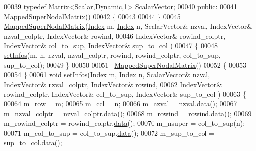 \begin{DoxyCode}
00039     \textcolor{keyword}{typedef} \hyperlink{group___core___module}{Matrix<Scalar,Dynamic,1>} \hyperlink{group___core___module}{ScalarVector};
00040   \textcolor{keyword}{public}:
00041     \hyperlink{group___sparse_l_u___module_class_eigen_1_1internal_1_1_mapped_super_nodal_matrix}{MappedSuperNodalMatrix}()
00042     \{
00043       
00044     \}
00045     \hyperlink{group___sparse_l_u___module_class_eigen_1_1internal_1_1_mapped_super_nodal_matrix}{MappedSuperNodalMatrix}(\hyperlink{namespace_eigen_a62e77e0933482dafde8fe197d9a2cfde}{Index} m, \hyperlink{namespace_eigen_a62e77e0933482dafde8fe197d9a2cfde}{Index} n,  ScalarVector& nzval, 
      IndexVector& nzval\_colptr, IndexVector& rowind,
00046              IndexVector& rowind\_colptr, IndexVector& col\_to\_sup, IndexVector& sup\_to\_col )
00047     \{
00048       \hyperlink{group___sparse_l_u___module_af1427486564e2c75b9da68f98bd04e63}{setInfos}(m, n, nzval, nzval\_colptr, rowind, rowind\_colptr, col\_to\_sup, sup\_to\_col);
00049     \}
00050     
00051     ~\hyperlink{group___sparse_l_u___module_class_eigen_1_1internal_1_1_mapped_super_nodal_matrix}{MappedSuperNodalMatrix}()
00052     \{
00053       
00054     \}
\hyperlink{group___sparse_l_u___module_af1427486564e2c75b9da68f98bd04e63}{00061}     \textcolor{keywordtype}{void} \hyperlink{group___sparse_l_u___module_af1427486564e2c75b9da68f98bd04e63}{setInfos}(\hyperlink{namespace_eigen_a62e77e0933482dafde8fe197d9a2cfde}{Index} m, \hyperlink{namespace_eigen_a62e77e0933482dafde8fe197d9a2cfde}{Index} n, ScalarVector& nzval, IndexVector& nzval\_colptr, 
      IndexVector& rowind,
00062              IndexVector& rowind\_colptr, IndexVector& col\_to\_sup, IndexVector& sup\_to\_col )
00063     \{
00064       m\_row = m;
00065       m\_col = n; 
00066       m\_nzval = nzval.\hyperlink{class_eigen_1_1_plain_object_base_ac25699535374b1854cf8494e44ad31b2}{data}(); 
00067       m\_nzval\_colptr = nzval\_colptr.\hyperlink{class_eigen_1_1_plain_object_base_ac25699535374b1854cf8494e44ad31b2}{data}(); 
00068       m\_rowind = rowind.\hyperlink{class_eigen_1_1_plain_object_base_ac25699535374b1854cf8494e44ad31b2}{data}(); 
00069       m\_rowind\_colptr = rowind\_colptr.\hyperlink{class_eigen_1_1_plain_object_base_ac25699535374b1854cf8494e44ad31b2}{data}(); 
00070       m\_nsuper = col\_to\_sup(n); 
00071       m\_col\_to\_sup = col\_to\_sup.\hyperlink{class_eigen_1_1_plain_object_base_ac25699535374b1854cf8494e44ad31b2}{data}(); 
00072       m\_sup\_to\_col = sup\_to\_col.\hyperlink{class_eigen_1_1_plain_object_base_ac25699535374b1854cf8494e44ad31b2}{data}(); 

\end{DoxyCode}
